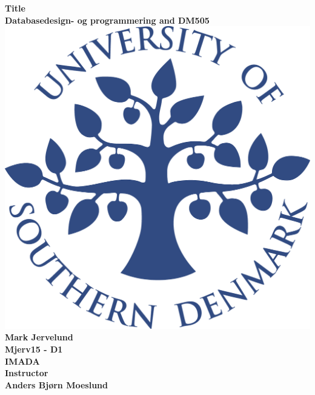 \documentclass[a4paper,10pt,titlepage]{report}
\date{}
\begin{document}
\begin{titlepage}
\centering
    \vspace*{9\baselineskip}
    \huge
    \bfseries
    Title \\
    \normalfont 
	\huge    
    Databasedesign- og programmering and DM505  \\[4\baselineskip]
    \normalfont
	\includegraphics[scale=0.2]{SDU_logo}
    \vfill
    Mark Jervelund \\ Mjerv15 - D1 \\ 
    \vspace{5mm}
    IMADA \\
    \vspace{5mm} Instructor \\ 
    Anders Bjørn Moeslund
    \\ \vspace{5mm}
    \textbf{\datedate} \\[2\baselineskip]
\end{titlepage}

\renewcommand{\thepage}{\roman{page}}%
\tableofcontents

\newpage
\setcounter{page}{1}
\renewcommand{\thepage}{\arabic{page}}
\end{document}
